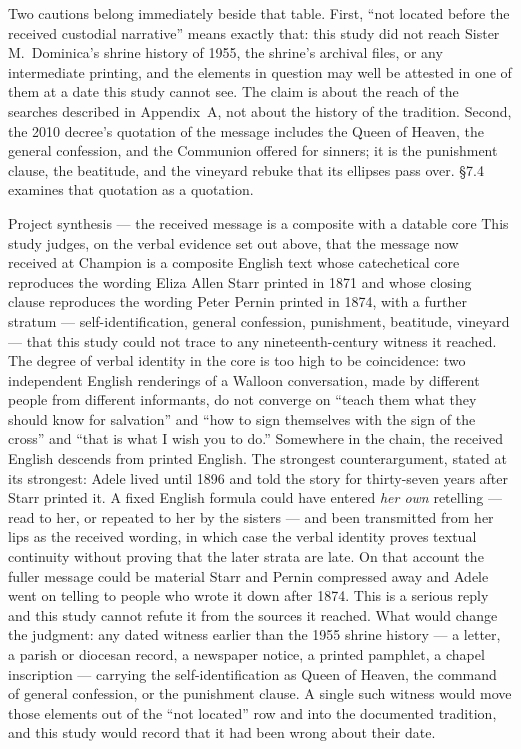 Two cautions belong immediately beside that table. First, ``not located
before the received custodial narrative'' means exactly that: this
study did not reach Sister M.~Dominica's shrine history of 1955, the
shrine's archival files, or any intermediate printing, and the elements
in question may well be attested in one of them at a date this study
cannot see. The claim is about the reach of the searches described in
Appendix~A, not about the history of the tradition. Second, the 2010
decree's quotation of the message includes the Queen of Heaven, the
general confession, and the Communion offered for sinners; it is the
punishment clause, the beatitude, and the vineyard rebuke that its
ellipses pass over. \S7.4 examines that quotation as a quotation.

\begin{judgmentbox}{Project synthesis --- the received message is a
composite with a datable core}
This study judges, on the verbal evidence set out above, that the
message now received at Champion is a composite English text whose
catechetical core reproduces the wording Eliza Allen Starr printed in
1871 and whose closing clause reproduces the wording Peter Pernin
printed in 1874, with a further stratum --- self-identification,
general confession, punishment, beatitude, vineyard --- that this study
could not trace to any nineteenth-century witness it reached. The
degree of verbal identity in the core is too high to be coincidence:
two independent English renderings of a Walloon conversation, made by
different people from different informants, do not converge on
``teach them what they should know for salvation'' and ``how to sign
themselves with the sign of the cross'' and ``that is what I wish you
to do.'' Somewhere in the chain, the received English descends from
printed English.\jsep
The strongest counterargument, stated at its strongest: Adele lived
until 1896 and told the story for thirty-seven years after Starr
printed it. A fixed English formula could have entered \emph{her own}
retelling --- read to her, or repeated to her by the sisters --- and
been transmitted from her lips as the received wording, in which case
the verbal identity proves textual continuity without proving that the
later strata are late. On that account the fuller message could be
material Starr and Pernin compressed away and Adele went on telling to
people who wrote it down after 1874. This is a serious reply and this
study cannot refute it from the sources it reached.\jsep
What would change the judgment: any dated witness earlier than the
1955 shrine history --- a letter, a parish or diocesan record, a
newspaper notice, a printed pamphlet, a chapel inscription --- carrying
the self-identification as Queen of Heaven, the command of general
confession, or the punishment clause. A single such witness would move
those elements out of the ``not located'' row and into the documented
tradition, and this study would record that it had been wrong about
their date.
\end{judgmentbox}

